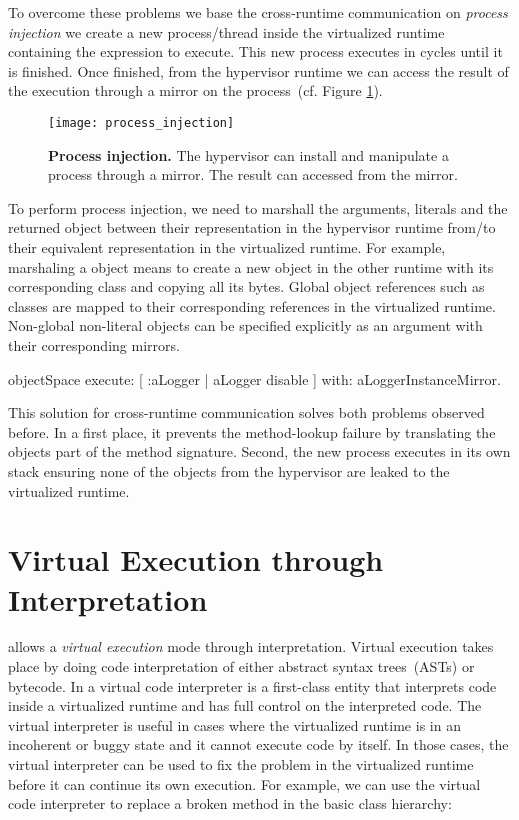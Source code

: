 To overcome these problems we base the cross-runtime communication on \emph{process injection} \ie we create a new process/thread inside the virtualized runtime containing the expression to execute. This new process executes in cycles until it is finished. Once finished, from the hypervisor runtime we can access the result of the execution through a mirror on the process~(cf. Figure \ref{fig:process_injection}).

\begin{figure}[ht]
\center
\texttt{[image: process\_injection]}
\caption{\textbf{Process injection.} The hypervisor can install and manipulate a process through a mirror. The result can accessed from the mirror.\label{fig:process_injection}}
\end{figure}

To perform process injection, we need to marshall the arguments, literals and the returned object between their representation in the hypervisor runtime from/to their equivalent representation in the virtualized runtime. For example, marshaling a  object means to create a new  object in the other runtime with its corresponding class and copying all its bytes. Global object references such as classes are mapped to their corresponding references in the virtualized runtime. Non-global non-literal objects can be specified explicitly as an argument with their corresponding mirrors.

\begin{code}
objectSpace
	execute: [ :aLogger | aLogger disable ]
	with: aLoggerInstanceMirror.
\end{code}

This solution for cross-runtime communication solves both problems observed before. In a first place, it prevents the method-lookup failure by translating the objects part of the method signature. Second, the new process executes in its own stack ensuring none of the objects from the hypervisor are leaked to the virtualized runtime.

\section{Virtual Execution through Interpretation} \label{sec:interpretation}

\Vtt allows a \emph{virtual execution} mode through interpretation. Virtual execution takes place by doing code interpretation of either abstract syntax trees~(ASTs) or bytecode. In \Vtt a virtual code interpreter is a first-class entity that interprets code inside a virtualized runtime and has full control on the interpreted code. The virtual interpreter is useful in cases where the virtualized runtime is in an incoherent or buggy state and it cannot execute code by itself. In those cases, the virtual interpreter can be used to fix the problem in the virtualized runtime before it can continue its own execution. For example, we can use the virtual code interpreter to replace a broken method in the basic class hierarchy:

